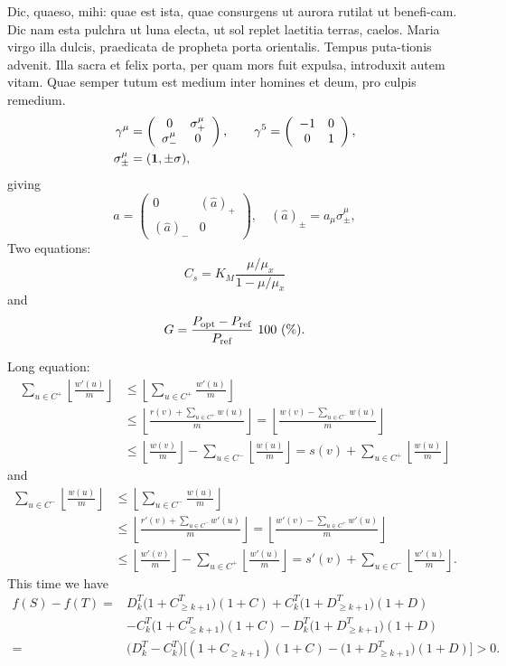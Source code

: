 \documentclass{arkiv}
\def\SM#1#2{\sum_{#1\in #2}}
\def\FL#1{\left\lfloor #1 \right\rfloor}
\def\FR#1#2{{\frac{#1}{#2}}}
\begin{document}
Dic, quaeso, mihi: quae est ista, quae consurgens ut aurora rutilat
ut benefi-cam.  Dic nam esta pulchra ut luna electa, ut sol replet
laetitia terras, caelos.  Maria virgo illa dulcis, praedicata de
propheta porta orientalis. Tempus puta-tionis advenit. Illa sacra et
felix porta, per quam mors fuit expulsa, introduxit autem vitam. Quae
semper tutum est medium inter homines et deum, pro culpis remedium.
%
\begin{align}
\gamma^\mu  & =
 \left(
\begin{array}{cc}
0 & \sigma^\mu_+ \\
\sigma^\mu_- & 0
\end{array}     \right) ,\qquad
 \gamma^5= \left(
\begin{array}{cc}
-1 &   0\\
0 &   1
\end{array}     \right)  , \nonumber \\
\sigma^\mu_{\pm}  & =    ({\bf 1} ,\pm \sigma) , \nonumber
\end{align}
giving
\begin{equation}
\hat a= \left(
\begin{array}{cc}
0 & (\hat a)_+\\
(\hat a)_- & 0
\end{array}\right),\quad (\hat a)_\pm=a_\mu\sigma^\mu_\pm ,
\end{equation}
Two equations:
\begin{equation}
    C_{s}  =  K_{M} \frac{\mu/\mu_{x}}{1-\mu/\mu_{x}} \label{ccs}
\end{equation}
and
\begin{equation}
    G = \frac{P_{\rm opt} - P_{\rm ref}}{P_{\rm ref}} \mbox{\ }100 \mbox{\
    }(\%).
\end{equation}

Long equation:
\begin{align}
\SM u{C^+}\FL{\FR{w'(u)}m}&\le \FL{\SM u{C^+} \FR{w'(u)}m}\nonumber\\ &\le
\FL{\FR{r(v)+\SM u{C^+} w(u)}m} = \FL{\FR{w(v)-\SM u{C^-} w(u)}m}\nonumber\\
&\le \FL{\FR{w(v)}m}-\SM u{C^-}\FL{\FR{w(u)}m}
= s(v)+\SM u{C^+}\FL{\FR{w(u)}m}
\end{align}
and
\begin{align}
\SM u{C^-}\FL{\FR{w(u)}m}&\le \FL{\SM u{C^-} \FR{w(u)}m}\nonumber\\ & \le
\FL{\FR{r'(v)+\SM u{C^-} w'(u)}m} = \FL{\FR{w'(v)-\SM u{C^+} w'(u)}m}\nonumber\\
&\le \FL{\FR{w'(v)}m}-\SM u{C^+}\FL{\FR{w'(u)}m}
= s'(v)+\SM u{C^-}\FL{\FR{w'(u)}m}.
\end{align}
This time we have
\begin{align}
f(S)-f(T) =    {}  &  D_k^T\bigl(1+C_{\geq k+1}^T\bigr)(1 + C) + C_k^T\bigl(1+D_{\geq k+1}^T\bigr)(1 + D) \nonumber\\
        {}   &  - C_k^T\bigl(1+C_{\geq k+1}^T\bigr)(1 + C) - D_k^T\bigl(1+D_{\geq k+1}^T\bigr)(1 + D)   \nonumber\\
=     {} &   \bigl(D_k^T-C_k^T\bigr)\bigl[(1+C_{\geq k+1})(1+C)-\bigl(1+D_{\geq
k+1}^T\bigr)(1+D)\bigr]>0.
\end{align}
\end{document}
